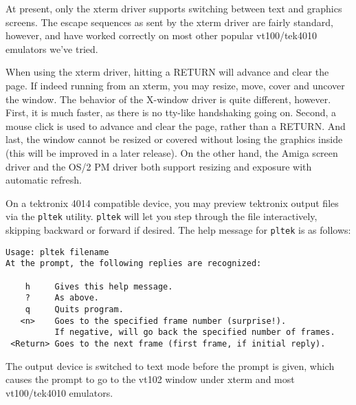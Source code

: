 At present, only the xterm driver supports switching between text
and graphics screens.  The escape sequences as sent by the xterm driver
are fairly standard, however, and have worked correctly on most other
popular vt100/tek4010 emulators we've tried.

When using the xterm driver, hitting a RETURN will advance and clear the
page.  If indeed running from an xterm, you may resize, move, cover and
uncover the window.  The behavior of the X-window driver is quite different,
however.  First, it is much faster, as there is no tty-like handshaking
going on.  Second, a mouse click is used to advance and clear the page,
rather than a RETURN.  And last, the window cannot be resized or covered
without losing the graphics inside (this will be improved in a later
release).  On the other hand, the Amiga screen driver and the OS/2 PM driver
both support resizing and exposure with automatic refresh.

On a tektronix 4014 compatible device, you may preview tektronix output
files via the {\tt pltek} utility.  {\tt pltek} will let you step through the
file interactively, skipping backward or forward if desired.  The help
message for {\tt pltek} is as follows:
\begin{verbatim}
Usage: pltek filename 
At the prompt, the following replies are recognized:

    h     Gives this help message.
    ?     As above.
    q     Quits program.
   <n>    Goes to the specified frame number (surprise!).
          If negative, will go back the specified number of frames.
 <Return> Goes to the next frame (first frame, if initial reply).
\end{verbatim}
The output device is switched to text mode before the prompt is given,
which causes the prompt to go to the vt102 window under xterm and
most vt100/tek4010 emulators.
